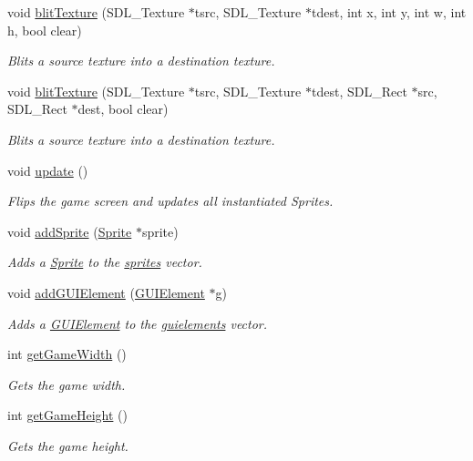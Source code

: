 \begin{DoxyCompactItemize}
void \hyperlink{class_graphics_a2b8441851d9c70e6ae7b3c103f46162d}{blit\-Texture} (S\-D\-L\-\_\-\-Texture $\ast$tsrc, S\-D\-L\-\_\-\-Texture $\ast$tdest, int x, int y, int w, int h, bool clear)
\begin{DoxyCompactList}\small\item\em Blits a source texture into a destination texture. \end{DoxyCompactList}\item 
void \hyperlink{class_graphics_ab3ba379c5c196820b59dcda8fda24db9}{blit\-Texture} (S\-D\-L\-\_\-\-Texture $\ast$tsrc, S\-D\-L\-\_\-\-Texture $\ast$tdest, S\-D\-L\-\_\-\-Rect $\ast$src, S\-D\-L\-\_\-\-Rect $\ast$dest, bool clear)
\begin{DoxyCompactList}\small\item\em Blits a source texture into a destination texture. \end{DoxyCompactList}\item 
void \hyperlink{class_graphics_a5a5297a160c22f73300dcf72ac0be7c2}{update} ()
\begin{DoxyCompactList}\small\item\em Flips the game screen and updates all instantiated Sprites. \end{DoxyCompactList}\item 
void \hyperlink{class_graphics_a398c8e6d13eda586fcfb50952ba25eac}{add\-Sprite} (\hyperlink{class_sprite}{Sprite} $\ast$sprite)
\begin{DoxyCompactList}\small\item\em Adds a \hyperlink{class_sprite}{Sprite} to the \hyperlink{class_graphics_ad01e5a24a1ce34c64f6dd7de4f85fc8b}{sprites} vector. \end{DoxyCompactList}\item 
void \hyperlink{class_graphics_ad06e41bffceda0186291e520fb37fa67}{add\-G\-U\-I\-Element} (\hyperlink{class_g_u_i_element}{G\-U\-I\-Element} $\ast$g)
\begin{DoxyCompactList}\small\item\em Adds a \hyperlink{class_g_u_i_element}{G\-U\-I\-Element} to the \hyperlink{class_graphics_ac4ea71ee39d3cbc7b3fc14bf89fa400f}{guielements} vector. \end{DoxyCompactList}\item 
int \hyperlink{class_graphics_a6364aacb31a2f59c0ad7b423d10a6e3a}{get\-Game\-Width} ()
\begin{DoxyCompactList}\small\item\em Gets the game width. \end{DoxyCompactList}\item 
int \hyperlink{class_graphics_a714496ad1b9244d6f9dafe665b35860d}{get\-Game\-Height} ()
\begin{DoxyCompactList}\small\item\em Gets the game height. \end{DoxyCompactList}\end{DoxyCompactItemize}
